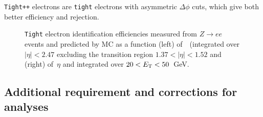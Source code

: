 \texttt{Tight++} electrons are \texttt{tight} electrons with asymmetric $\Delta\phi$ cuts, which give
both better efficiency and rejection.

\begin{figure}[tb]\begin{center}
	\caption{\texttt{Tight} electron identification efficiencies measured from $Z\to ee$ events and predicted by MC as a function (left) of~\ET\ (integrated over $|\eta|< 2.47$ excluding the transition region $1.37< |\eta|<1.52$ and (right) of~$\eta$ and integrated over $20< \ET<50$~GeV.~\cite{eperf}\label{fig:eleeff}}
\end{center}\end{figure}


\tocless\subsection{Additional requirement and corrections for analyses}\label{sec:REQtrigger}

